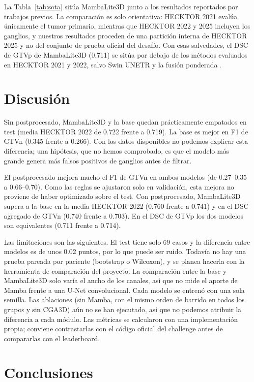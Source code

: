 \documentclass[conference]{IEEEtran}
\begin{document}
La Tabla~\ref{tab:sota} sitúa MambaLite3D junto a los resultados reportados por trabajos previos. La comparación es solo orientativa: HECKTOR 2021 evalúa únicamente el tumor primario, mientras que HECKTOR 2022 y 2025 incluyen los ganglios, y nuestros resultados proceden de una partición interna de HECKTOR 2025 y no del conjunto de prueba oficial del desafío. Con esas salvedades, el DSC de GTVp de MambaLite3D (0.711) se sitúa por debajo de los métodos evaluados en HECKTOR 2021 y 2022, salvo Swin UNETR \cite{Chu2023114} y la fusión ponderada \cite{MAHDI2024}.

\section{Discusión}
\label{sec:discusion}

Sin postprocesado, MambaLite3D y la base quedan prácticamente empatados en test (media HECKTOR 2022 de 0.722 frente a 0.719). La base es mejor en F1 de GTVn (0.345 frente a 0.266). Con los datos disponibles no podemos explicar esta diferencia; una hipótesis, que no hemos comprobado, es que el modelo más grande genera más falsos positivos de ganglios antes de filtrar.

El postprocesado mejora mucho el F1 de GTVn en ambos modelos (de 0.27–0.35 a 0.66–0.70). Como las reglas se ajustaron solo en validación, esta mejora no proviene de haber optimizado sobre el test. Con postprocesado, MambaLite3D supera a la base en la media HECKTOR 2022 (0.760 frente a 0.741) y en el DSC agregado de GTVn (0.740 frente a 0.703). En el DSC de GTVp los dos modelos son equivalentes (0.711 frente a 0.714).

Las limitaciones son las siguientes. El test tiene solo 69 casos y la diferencia entre modelos es de unos 0.02 puntos, por lo que puede ser ruido. Todavía no hay una prueba pareada por paciente (bootstrap o Wilcoxon), y se planea hacerla con la herramienta de comparación del proyecto. La comparación entre la base y MambaLite3D solo varía el ancho de los canales, así que no mide el aporte de Mamba frente a una U-Net convolucional. Cada modelo se entrenó con una sola semilla. Las ablaciones (sin Mamba, con el mismo orden de barrido en todos los grupos y sin CGA3D) aún no se han ejecutado, así que no podemos atribuir la diferencia a cada módulo. Las métricas se calcularon con una implementación propia; conviene contrastarlas con el código oficial del challenge antes de compararlas con el leaderboard.

\section{Conclusiones}
\label{sec:conclusiones}
\end{document}
